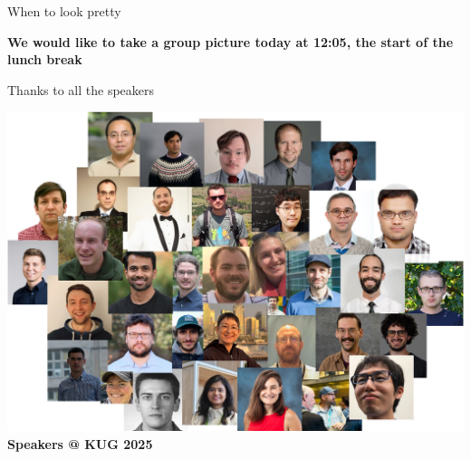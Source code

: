 \begin{frame}[fragile]{When to look pretty}
\begin{center}
\textbf{We would like to take a group picture today at 12:05, the start of the lunch break}
\vspace{0.5cm}
\end{center}
\end{frame}

\begin{frame}[fragile]{Thanks to all the speakers}

  \begin{center}
  \includegraphics[height=0.7\textheight]{figures/mosaic.jpg}
  \\
  \textbf{Speakers @ KUG 2025}
  \end{center}

\end{frame}